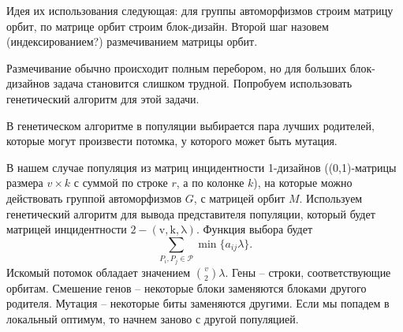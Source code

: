 \documentclass[a4,12pt]{article}
\theoremstyle{remark}
\newcommand{\bdp}{\mathcal{P}}
\newcommand{\bd}[4]{\operatorname{#1-(#2,#3,#4)}}
\begin{document}
Идея их использования следующая: для группы автоморфизмов строим матрицу орбит, по матрице орбит строим блок-дизайн. Второй шаг назовем (индексированием?) размечиванием матрицы орбит.

Размечивание обычно происходит полным перебором, но для больших блок-дизайнов задача становится слишком трудной. Попробуем использовать генетический алгоритм для этой задачи.

В генетическом алгоритме в популяции выбирается пара лучших родителей, которые могут произвести потомка, у которого может быть мутация.

В нашем случае популяция из матриц инцидентности 1-дизайнов ((0,1)-матрицы размера $v \times k$ с суммой по строке $r$, а по колонке $k$), на которые можно действовать группой автоморфизмов $G$, с матрицей орбит $M$. Используем генетический алгоритм для вывода представителя популяции, который будет матрицей инцидентности $\bd{2}{v}{k}{\lambda}$. Функция выбора будет $$\sum_{P_i, P_j \in \bdp} \min \{ a_{ij} \lambda \}.$$ Искомый потомок обладает значением $\binom{v}{2} \lambda$. Гены -- строки, соответствующие орбитам. Смешение генов -- некоторые блоки заменяются блоками другого родителя. Мутация -- некоторые биты заменяются другими. Если мы попадем в локальный оптимум, то начнем заново с другой популяцией.
\end{document}
